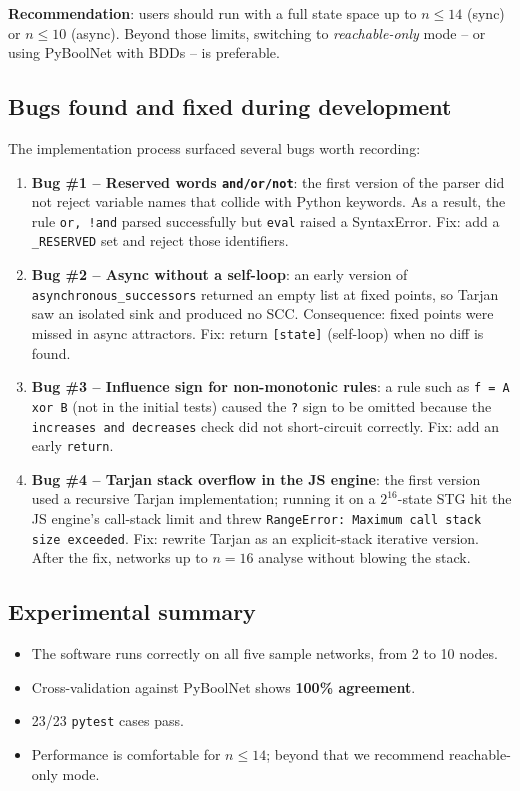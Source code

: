 \documentclass[oneside,final]{hcmut-report}
\begin{document}
\textbf{Recommendation}: users should run with a full state space up to $n \leq 14$ (sync) or $n \leq 10$ (async). Beyond those limits, switching to \textit{reachable-only} mode -- or using PyBoolNet with BDDs -- is preferable.

\subsection{Bugs found and fixed during development}\label{subsec:bugs}

The implementation process surfaced several bugs worth recording:

\begin{enumerate}[leftmargin=*]
    \item \textbf{Bug \#1 -- Reserved words \texttt{and/or/not}}: the first version of the parser did not reject variable names that collide with Python keywords. As a result, the rule \texttt{or, !and} parsed successfully but \texttt{eval} raised a SyntaxError. Fix: add a \texttt{\_RESERVED} set and reject those identifiers.
    \item \textbf{Bug \#2 -- Async without a self-loop}: an early version of \texttt{asynchronous\_successors} returned an empty list at fixed points, so Tarjan saw an isolated sink and produced no SCC. Consequence: fixed points were missed in async attractors. Fix: return \texttt{[state]} (self-loop) when no diff is found.
    \item \textbf{Bug \#3 -- Influence sign for non-monotonic rules}: a rule such as \texttt{f = A xor B} (not in the initial tests) caused the \texttt{?} sign to be omitted because the \texttt{increases and decreases} check did not short-circuit correctly. Fix: add an early \texttt{return}.
    \item \textbf{Bug \#4 -- Tarjan stack overflow in the JS engine}: the first version used a recursive Tarjan implementation; running it on a $2^{16}$-state STG hit the JS engine's call-stack limit and threw \texttt{RangeError: Maximum call stack size exceeded}. Fix: rewrite Tarjan as an explicit-stack iterative version. After the fix, networks up to $n = 16$ analyse without blowing the stack.
\end{enumerate}

\subsection{Experimental summary}\label{subsec:exp-summary}

\begin{itemize}[leftmargin=*]
    \item The software runs correctly on all five sample networks, from 2 to 10 nodes.
    \item Cross-validation against PyBoolNet shows \textbf{100\% agreement}.
    \item 23/23 \texttt{pytest} cases pass.
    \item Performance is comfortable for $n \leq 14$; beyond that we recommend reachable-only mode.
\end{itemize}
\end{document}
